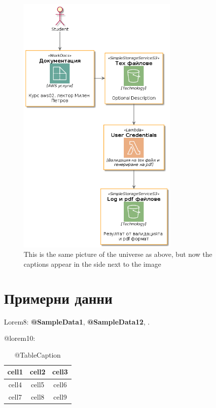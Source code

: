 \documentclass[12pt]{article}
\begin{document}
\begin{figure}
  \centering
  \includegraphics[width=0.7\textwidth]{9999_fig1.png}
    \caption{This is the same picture of the universe as above, but now the captions appear in the side next to the image}
\end{figure}

\section{Примерни данни}

Lorem8: \textbf{@SampleData1}, \textbf{@SampleData12}, . 

 \noindent @lorem10:



\begin{table}
\caption{@TableCaption}
\center
\begin{tabular}{ |c|c|c| }
 \hline
 cell1 & cell2 & cell3 \\ \hline
 cell4 & cell5 & cell6 \\ \hline 
 cell7 & cell8 & cell9 \\ 
 \hline
\end{tabular}
\end{table}
\end{document}
